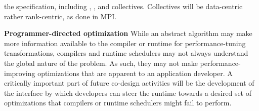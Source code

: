 \begin{compactdesc}
  the specification, including ,
  , and  collectives.
Collectives will be data-centric rather rank-centric, as done in MPI.
\item{\bf Programmer-directed optimization}
While an abstract algorithm may make more information available to the compiler or runtime for performance-tuning transformations,
compilers and runtime schedulers may not always understand the global nature of the problem.
As such, they may not make performance-improving optimizations that are apparent to an application developer.
A critically important part of future co-design activities will be the
development of the interface by which developers can steer the runtime towards
a desired set of optimizations that compilers or runtime schedulers might fail
to perform.
\end{compactdesc}






 

